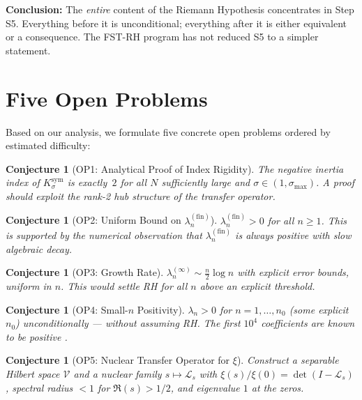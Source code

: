 \documentclass[12pt,a4paper]{article}
\newtheorem{conjecture}[theorem]{Conjecture}
\theoremstyle{definition}
\theoremstyle{remark}
\newcommand{\Ksym}{K_\sigma^{\mathrm{sym}}}
\begin{document}
\noindent\textbf{Conclusion:} The \emph{entire} content of the Riemann Hypothesis concentrates in Step S5. Everything before it is unconditional; everything after it is either equivalent or a consequence. The FST-RH program has not reduced S5 to a simpler statement.


\section{Five Open Problems}
\label{sec:open-problems}

Based on our analysis, we formulate five concrete open problems ordered by estimated difficulty:

\begin{conjecture}[OP1: Analytical Proof of Index Rigidity]
The negative inertia index of $\Ksym$ is exactly~$2$ for all $N$ sufficiently large and $\sigma \in (1, \sigma_{\max})$. A proof should exploit the rank-2 hub structure of the transfer operator.
\end{conjecture}

\begin{conjecture}[OP2: Uniform Bound on $\lambda_n^{(\mathrm{fin})}$]
$\lambda_n^{(\mathrm{fin})} > 0$ for all $n \geq 1$. This is supported by the numerical observation that $\lambda_n^{(\mathrm{fin})}$ is always positive with slow algebraic decay.
\end{conjecture}

\begin{conjecture}[OP3: Growth Rate]
$\lambda_n^{(\infty)} \sim \frac{n}{2}\log n$ with explicit error bounds, uniform in $n$. This would settle RH for all $n$ above an explicit threshold.
\end{conjecture}

\begin{conjecture}[OP4: Small-$n$ Positivity]
$\lambda_n > 0$ for $n = 1, \ldots, n_0$ (some explicit $n_0$) unconditionally --- without assuming RH. The first $10^4$ coefficients are known to be positive \cite{Keiper1992}.
\end{conjecture}

\begin{conjecture}[OP5: Nuclear Transfer Operator for $\xi$]
Construct a separable Hilbert space $\mathcal{V}$ and a nuclear family $s \mapsto \mathcal{L}_s$ with $\xi(s)/\xi(0) = \det(I - \mathcal{L}_s)$, spectral radius $< 1$ for $\Re(s) > 1/2$, and eigenvalue $1$ at the zeros.
\end{conjecture}
\end{document}
